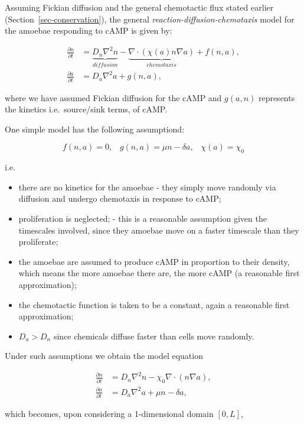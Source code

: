 \documentclass[
  letterpaper,
  DIV=11,
  numbers=noendperiod]{scrreprt}
\theoremstyle{definition}
\theoremstyle{plain}
\theoremstyle{plain}
\theoremstyle{remark}
\begin{document}
Assuming Fickian diffusion and the general chemotactic flux stated
earlier (Section~\ref{sec-conservation}), the general
\emph{reaction-diffusion-chemotaxis} model for the amoebae responding to
cAMP is given by:

\[
\begin{aligned}
\frac{\partial n}{\partial  t} &=  \underbrace{D_n \nabla^2 n}_{diffusion} - \underbrace{\nabla \cdot \left( \chi(a) n \nabla a \right)}_{chemotaxis} + f(n,a),   \\
\frac{\partial a}{\partial  t} & =   D_a \nabla^2 a + g(n,a), 
\end{aligned}
\]

where we have assumed Fickian diffusion for the cAMP and \(g(a,n)\)
represents the kinetics i.e.~source/sink terms, of cAMP.

One simple model has the following assumptiond:

\[f(n,a) = 0, \;\;\; g(n,a) = \mu n - \delta a, \;\;\; \chi (a) = \chi_0\]

i.e.~

\begin{itemize}
\item
  there are no kinetics for the amoebae - they simply move randomly via
  diffusion and undergo chemotaxis in response to cAMP;
\item
  proliferation is neglected; - this is a reasonable assumption given
  the timescales involved, since they amoebae move on a faster timescale
  than they proliferate;
\item
  the amoebae are assumed to produce cAMP in proportion to their
  density, which means the more amoebae there are, the more cAMP (a
  reasonable first approximation);
\item
  the chemotactic function is taken to be a constant, again a reasonable
  first approximation;
\item
  \(D_a > D_n\) since chemicals diffuse faster than cells move randomly.
\end{itemize}

Under such assumptions we obtain the model equation

\[
\begin{aligned}
\frac{\partial n}{\partial  t} & =  D_n \nabla^2 n - \chi_0 \nabla \cdot \left( n \nabla a \right), \\
\frac{\partial a}{\partial  t} & =   D_a \nabla^2 a +  \mu n - \delta a,
\end{aligned}
\]

which becomes, upon considering a 1-dimensional domain \([0,L]\),
\end{document}
